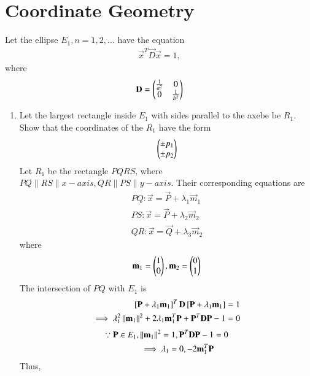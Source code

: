 \documentclass[journal,12pt,twocolumn]{IEEEtran}
\renewcommand\thesection{\arabic{section}}
\begin{document}
\section{Coordinate Geometry}
Let the ellipse $E_1, n = 1, 2,  \dots$ have the equation 
\begin{align}
\vec{x}^T\vec{D}\vec{x} = 1,
\end{align}
%
where 
\begin{align}
\mathbf{D} = \begin{pmatrix}\frac{1}{a^2} & 0 \\ 0 & \frac{1}{b^2}\end{pmatrix} 
\end{align}
\begin{enumerate}[label=\thesection.\arabic*
,ref=\thesection.\theenumi]
\item Let the largest rectangle inside $E_1$  with sides parallel to the axebe be $R_1$.
Show that the coordinates of the $R_1$ have the form
\begin{align}
 \begin{pmatrix}\pm p_1 \\ \pm p_2\end{pmatrix}
\end{align}
\solution Let $R_1$ be the rectangle $PQRS$, where $PQ \parallel RS \parallel x-axis, QR \parallel PS \parallel y-axis $. Their corresponding equations are 
\begin{align}
\label{eq:9_pq}
PQ: \vec{x} = \vec{P} +  \lambda_1 \vec{m}_1
\\
\label{eq:9_ps}
PS: \vec{x} = \vec{P} +  \lambda_2 \vec{m}_2
\\
\label{eq:9_qr}
QR: \vec{x} = \vec{Q} +  \lambda_3 \vec{m}_2
\end{align}
%
where 
\begin{align}
\mathbf{m}_1=\begin{pmatrix}1\\  0\end{pmatrix},
\mathbf{m}_2=\begin{pmatrix}0\\  1\end{pmatrix}
\end{align}
The intersection of $PQ$ with $E_1$ is
\begin{align}
{}\left[\mathbf{P} +  \lambda_1 \mathbf{m}_1\right]^T\mathbf{D}{}\left[\mathbf{P} +  \lambda_1 \mathbf{m}_1\right] &= 1
\nonumber \\
\implies \lambda_1^2 \left\Vert\mathbf{m}_1\right\Vert^2 + 2\lambda_1 \mathbf{m}_1^T\mathbf{P}+\mathbf{P}^T\mathbf{D}\mathbf{P} -1 & = 0
\nonumber 
\end{align}
\begin{align}
\because \mathbf{P} \in E_1, \left\Vert\mathbf{m}_1\right\Vert^2  = 1, \mathbf{P}^T\mathbf{D}\mathbf{P} -1 &= 0
\nonumber \\
\implies \lambda_1 = 0, -2\mathbf{m}_1^T\mathbf{P}
\end{align}
%
Thus,
\begin{align}

\end{align}
\end{enumerate}
\end{document}
